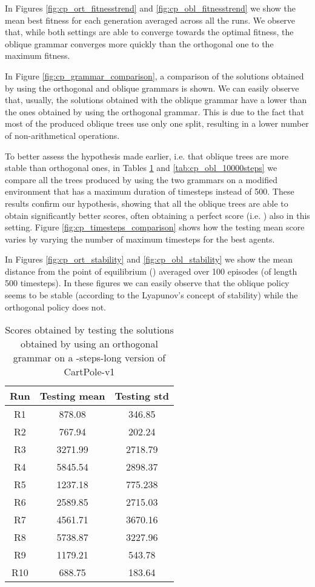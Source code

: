 \documentclass[review,english]{elsarticle}
\begin{document}
In Figures \ref{fig:cp_ort_fitnesstrend} and \ref{fig:cp_obl_fitnesstrend} we show the mean best fitness for each generation averaged across all the runs.
We observe that, while both settings are able to converge towards the optimal fitness, the oblique grammar converges more quickly than the orthogonal one to the maximum fitness.

In Figure \ref{fig:cp_grammar_comparison}, a comparison of the solutions obtained by using the orthogonal and oblique grammars is shown.
We can easily observe that, usually, the solutions obtained with the oblique grammar have a lower  than the ones obtained by using the orthogonal grammar.
This is due to the fact that most of the produced oblique trees use only one split, resulting in a lower number of non-arithmetical operations.

To better assess the hypothesis made earlier, i.e. that oblique trees are more stable than orthogonal ones, in Tables \ref{tab:cp_ort_10000steps} and \ref{tab:cp_obl_10000steps} we compare all the trees produced by using the two grammars on a modified environment that has a maximum duration of  timesteps instead of 500.
These results confirm our hypothesis, showing that all the oblique trees are able to obtain significantly better scores, often obtaining a perfect score (i.e. ) also in this setting.
Figure \ref{fig:cp_timesteps_comparison} shows how the testing mean score varies by varying the number of maximum timesteps for the best agents.

In Figures \ref{fig:cp_ort_stability} and \ref{fig:cp_obl_stability} we show the mean distance from the point of equilibrium () averaged over 100 episodes (of length 500 timesteps).
In these figures we can easily observe that the oblique policy seems to be stable (according to the Lyapunov's concept of stability) while the orthogonal policy does not.

\begin{table}[ht!]
    \centering
    \begin{tabular}{|c|c|c|} \hline
        \textbf{Run} & \textbf{Testing mean} & \textbf{Testing std} \\ \hline
        R1 & 878.08 & 346.85 \\ R2 & 767.94 & 202.24 \\ R3 & 3271.99 & 2718.79 \\ R4 & 5845.54 & 2898.37 \\ R5 & 1237.18 & 775.238 \\ R6 & 2589.85 & 2715.03 \\ R7 & 4561.71 & 3670.16 \\ R8 & 5738.87 & 3227.96 \\ R9 & 1179.21 & 543.78 \\ R10 & 688.75 & 183.64 \\ \hline
    \end{tabular}
    \caption{Scores obtained by testing the solutions obtained by using an orthogonal grammar on a -steps-long version of CartPole-v1}
    \label{tab:cp_ort_10000steps}
\end{table}
\end{document}
